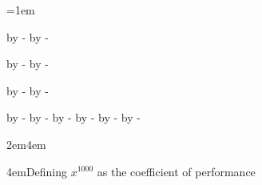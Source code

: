 \documentclass[11pt]{article}
\begin{document}
\parindent=1em

%
%
%
%

\def\wider{%
 \advance\leftskip by -\parindent
 \advance\rightskip by -\parindent}

\wider\lipsum[1]

\wider\lipsum[1]


\wider\lipsum[1]

\narrower\narrower\narrower\lipsum[1]

\wider\wider\wider\lipsum[1]

\def\leveli{\leftskip1em}
\def\levelii{\leftskip2em}
\def\leveliii{\multiply\leftskip by 13 }
\def\leveliii{\leftskip4em}

\levelii\lipsum[1]
\leveliii\lipsum[1]

\the\leftskip


\leveliii Defining $x^{1000}$ as the coefficient of performance
\end{document}
